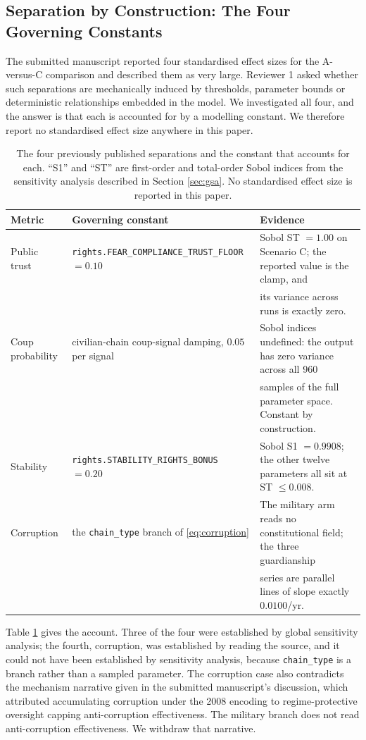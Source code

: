 \documentclass{ieeeaccess}
\begin{document}
\subsection{Separation by Construction: The Four Governing Constants}
\label{sec:effectsize}
The submitted manuscript reported four standardised effect sizes for the
A-versus-C comparison and described them as very large. Reviewer 1 asked
whether such separations are mechanically induced by thresholds,
parameter bounds or deterministic relationships embedded in the model.
We investigated all four, and the answer is that each is accounted for
by a modelling constant. We therefore report no standardised effect size
anywhere in this paper.

\begin{table}[!t]
\caption{The four previously published separations and the constant that
accounts for each. ``S1'' and ``ST'' are first-order and total-order
Sobol indices from the sensitivity analysis described in Section
\ref{sec:gsa}. No standardised effect size is reported in this paper.}
\label{tab:fourconstants}
\centering
\small
\begin{tabular}{@{}lll@{}}
\toprule
Metric & Governing constant & Evidence \\
\midrule
Public trust
  & \texttt{rights.FEAR\_COMPLIANCE\_TRUST\_FLOOR} $=0.10$
  & Sobol ST $=1.00$ on Scenario C; the reported value is the clamp, and \\
  & & its variance across runs is exactly zero. \\
Coup probability
  & civilian-chain coup-signal damping, $0.05$ per signal
  & Sobol indices undefined: the output has zero variance across all 960 \\
  & & samples of the full parameter space. Constant by construction. \\
Stability
  & \texttt{rights.STABILITY\_RIGHTS\_BONUS} $=0.20$
  & Sobol S1 $=0.9908$; the other twelve parameters all sit at ST $\le 0.008$. \\
Corruption
  & the \texttt{chain\_type} branch of \eqref{eq:corruption}
  & The military arm reads no constitutional field; the three guardianship \\
  & & series are parallel lines of slope exactly $0.0100$/yr. \\
\bottomrule
\end{tabular}
\end{table}

Table \ref{tab:fourconstants} gives the account. Three of the four were
established by global sensitivity analysis; the fourth, corruption, was
established by reading the source, and it could not have been
established by sensitivity analysis, because \texttt{chain\_type} is a
branch rather than a sampled parameter. The corruption case also
contradicts the mechanism narrative given in the submitted manuscript's
discussion, which attributed accumulating corruption under the 2008
encoding to regime-protective oversight capping anti-corruption
effectiveness. The military branch does not read anti-corruption
effectiveness. We withdraw that narrative.
\end{document}
